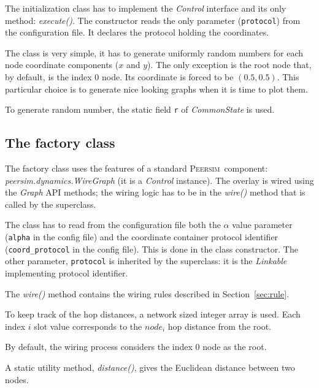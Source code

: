 \documentclass[a4paper,11pt]{article}
\newcommand{\id}[1]{{\scshape\small #1}}
\newcommand{\psim}{\id{Peersim}}
\begin{document}
The initialization class has to implement the \emph{Control} interface
and its only method: \emph{execute()}. 
The constructor reads the only parameter (\texttt{protocol}) from 
the configuration
file. It declares the protocol holding the coordinates.

The class is very simple, it
has to generate uniformly random numbers for each node coordinate
components ($x$ and $y$). The only exception is the root node that, by
default, is the index 0 node. Its coordinate is forced to be $(0.5,
0.5)$. This particular choice is to generate nice looking graphs when
it is time to plot them.

To generate random number, the static field \texttt{r} of
\emph{CommonState} is used.

\subsection{The factory class}
\label{s:factory}

The factory class uses the features of a standard \psim~component:
\emph{peersim.dynamics.WireGraph} (it is a \emph{Control}
instance). The overlay is wired using the 
\emph{Graph} API methods; the wiring logic has to be in the
\emph{wire()} method that is called by the superclass.

The class has to read from the configuration file both the $\alpha$
value parameter (\texttt{alpha} in the config file) and the coordinate
container protocol identifier (\texttt{coord\_protocol} in the config
file). This
is done in the class constructor. The other parameter, \texttt{protocol}
is inherited by the superclass: it is the \emph{Linkable}
implementing protocol identifier.

The \emph{wire()} method contains the wiring rules described in
Section~\ref{sec:rule}.

To keep track of the hop distances, a network sized integer array is
used. Each index $i$ slot value corresponds to the $node_{i}$ hop distance from the
root.

By default, the wiring process considers the index 0 node as the root.

A static utility method, \emph{distance()}, gives the Euclidean
distance between two nodes.
\end{document}
